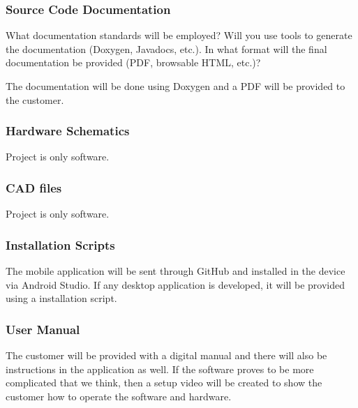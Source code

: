 \subsubsection{Source Code Documentation}
What documentation standards will be employed? Will you use tools to generate the documentation (Doxygen, Javadocs, etc.). In what format will the final documentation be provided (PDF, browsable HTML, etc.)?

The documentation will be done using Doxygen and a PDF will be provided to the customer.

\subsubsection{Hardware Schematics}
Project is only software.

\subsubsection{CAD files}
Project is only software.

\subsubsection{Installation Scripts}
The mobile application will be sent through GitHub and installed in the device via Android Studio. If any desktop application is developed, it will be provided using a installation script. 

\subsubsection{User Manual}
The customer will be provided with a digital manual and there will also be instructions in the application as well. If the software proves to be more complicated that we think, then a setup video will be created to show the customer how to operate the software and hardware.